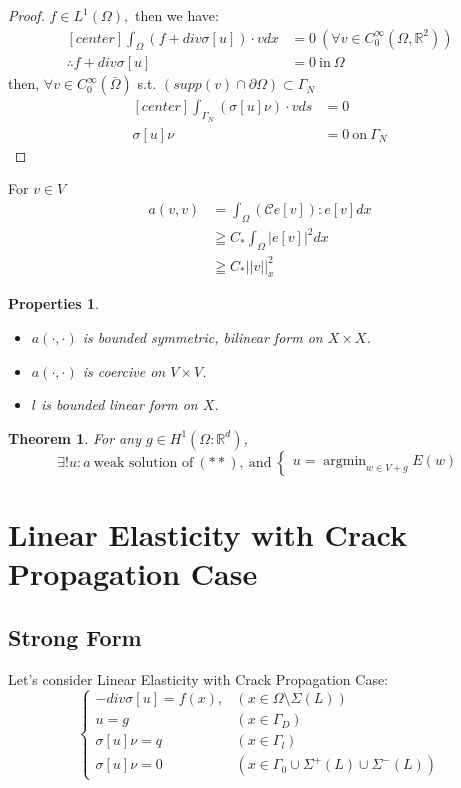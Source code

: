 \documentclass[a4paper,11pt]{article}
\newtheorem{prop}{Properties}
\newtheorem{theorem}{Theorem}
\newcommand{\R}{\mathbb{R}}
\newcommand{\Cmod}{\mathcal{C}}
\DeclareMathOperator*{\argmin}{argmin}
\begin{document}
\begin{proof}
	$f \in L^1(\Omega),$ then we have:
	\begin{equation*}
	\begin{aligned}[center]
	\int_\Omega (f + div \sigma[u]) \cdot v dx &= 0\ (\forall v \in C_0^\infty(\Omega,\R^2))\\
	\therefore f + div \sigma[u] &= 0\ \text{in}\ \Omega
	\end{aligned}
	\end{equation*}
	then, $\forall v \in C_0^\infty (\bar{\Omega})$ s.t. $(supp(v) \cap \partial\Omega) \subset \Gamma_N$
	\begin{equation*}
	\begin{aligned}[center]
	\int_{\Gamma_N} (\sigma[u]\nu)\cdot v ds &= 0\\
	\sigma[u]\nu &= 0\ \text{on}\ \Gamma_N
	\end{aligned}
	\end{equation*}
\end{proof}
For $v \in V$
\begin{equation*}
\begin{aligned}
a(v,v) &= \int_\Omega (\Cmod e[v]) : e[v] dx\\
&\geqq C_* \int_\Omega |e[v]|^2 dx\\
&\geqq C_* ||v||^2_x
\end{aligned}
\end{equation*}
\begin{prop}
	\begin{itemize}
		\item $a(\cdot,\cdot)$ is bounded symmetric, bilinear form on $X \times X$.
		\item $a(\cdot,\cdot)$ is coercive on $V \times V$.
		\item $l$ is bounded linear form on $X$.
	\end{itemize}
\end{prop}
\begin{theorem}
	For any $g\in H^1(\Omega : \R^d)$,
	\begin{equation*}
	\exists! u:a\ \text{weak solution of}\ (**),\ \text{and}\ \begin{cases}
	u=\argmin_{w\in V+g}E(w)
	\end{cases}
	\end{equation*}
\end{theorem}
\section{Linear Elasticity with Crack Propagation Case}
\subsection{Strong Form}
Let's consider Linear Elasticity with Crack Propagation Case:
\begin{equation}\label{eq:strongcrack}
\begin{cases}
-div \sigma[u] = f(x), & (x\in \Omega \setminus \Sigma(L))\\
u = g & (x \in \Gamma_D)\\
\sigma[u] \nu = q & (x \in \Gamma_l)\\
\sigma[u] \nu = 0 & (x \in\Gamma_0 \cup \Sigma^+(L) \cup \Sigma^-(L))
\end{cases}
\end{equation}
\end{document}
